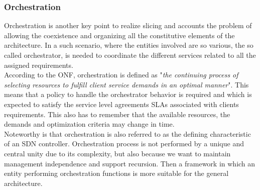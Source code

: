 \documentclass[a4paper,12pt]{report} %
\begin{document}
\subsubsection{Orchestration}
Orchestration is another key point to realize
slicing and accounts the problem of allowing the coexistence and organizing all the constitutive elements of the architecture.
In a such scenario, where the entities involved
are so various, the so called orchestrator, is needed to coordinate the different services related to all the assigned requirements.\\
According to the \gls{ONF},
orchestration is defined as "\textit{the continuing process of
selecting resources to fulfill client service demands
in an optimal manner}". This means that a policy to handle the orchestrator behavior is required and which is expected to satisfy the service level agreements \gls{SLA}s associated with clients
requirements. This also has to remember
that the available resources, the demands and optimization criteria may change in time. \\
Noteworthy is that orchestration is also referred to as the defining
characteristic of an SDN controller. Orchestration process is not performed by a unique and central unity due to its complexity, but also because we want to maintain management independence and support recursion. Then a framework in which an entity performing orchestration functions is more suitable for the general architecture. \cite{ordonez2017network} \cite{marsch20185g} \cite{rostami2017orchestration}
\end{document}
